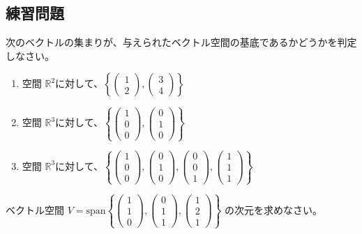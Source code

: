 \subsection{練習問題}
\begin{quiz}
次のベクトルの集まりが、与えられたベクトル空間の基底であるかどうかを判定しなさい。
\begin{enumerate}
\item 空間 $\mathbb{R}^2$に対して、$\left\{ \begin{pmatrix} 1 \\ 2 \end{pmatrix}, \begin{pmatrix} 3 \\ 4 \end{pmatrix} \right\}$
\item 空間 $\mathbb{R}^3$に対して、$\left\{ \begin{pmatrix} 1 \\ 0 \\ 0 \end{pmatrix}, \begin{pmatrix} 0 \\ 1 \\ 0 \end{pmatrix} \right\}$
\item 空間 $\mathbb{R}^3$に対して、$\left\{ \begin{pmatrix} 1 \\ 0 \\ 0 \end{pmatrix}, \begin{pmatrix} 0 \\ 1 \\ 0 \end{pmatrix}, \begin{pmatrix} 0 \\ 0 \\ 1 \end{pmatrix}, \begin{pmatrix} 1 \\ 1 \\ 1 \end{pmatrix} \right\}$
\end{enumerate}
\end{quiz}

\begin{quiz}
ベクトル空間 $V = \text{span}\left\{ \begin{pmatrix} 1 \\ 1 \\ 0 \end{pmatrix}, \begin{pmatrix} 0 \\ 1 \\ 1 \end{pmatrix}, \begin{pmatrix} 1 \\ 2 \\ 1 \end{pmatrix} \right\}$ の次元を求めなさい。
\end{quiz}